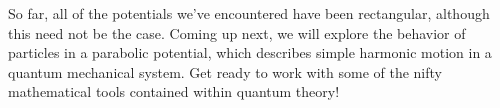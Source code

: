 So far, all of the potentials we've encountered have been rectangular, although this need not be the case. Coming up next, we will explore the behavior of particles in a parabolic potential, which describes simple harmonic motion in a quantum mechanical system. Get ready to work with some of the nifty mathematical tools contained within quantum theory!

%